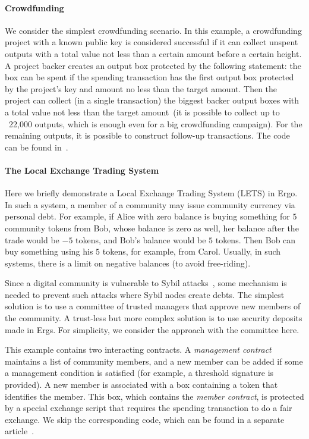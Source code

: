 \paragraph{Crowdfunding}

 We consider the simplest crowdfunding scenario. In this example, a crowdfunding project with a known public key is considered successful if it can collect unspent outputs with a total value not less than a certain amount before a certain height. A project backer creates an output box protected by the following statement: the box can be spent
 if the spending transaction has the first output box protected by the project's key and amount no less than the target amount.
 Then the project can collect (in a single transaction) the biggest backer output boxes with a total value not less than the target amount~(it is possible to collect up to ~22,000 outputs, which is
 enough even for a big crowdfunding campaign). For the remaining outputs, it is possible to construct follow-up transactions. The code can be found in~\cite{ergoTutorial}.

\paragraph{The Local Exchange Trading System}

 Here we briefly demonstrate a Local Exchange Trading System (LETS) in Ergo. In such a system, a member of a community may issue community currency via personal debt. For example, if Alice with zero balance is buying something for $5$
 community tokens from Bob, whose balance is zero as well, her balance after the trade would be $-5$ tokens, and
 Bob's balance would be $5$ tokens. Then Bob can buy something using his $5$ tokens, for example, from Carol.
 Usually, in such systems, there is a limit on negative balances (to avoid free-riding).

 Since a digital community is vulnerable to Sybil attacks~\cite{sybilDef}, some mechanism is needed to prevent such attacks where Sybil nodes create debts.
 The simplest solution is to use a committee of trusted managers that approve new members of the community. A trust-less but more complex solution is to use security deposits made in Ergs. For simplicity, we consider the approach with the committee here.

 This example contains two interacting contracts. A {\em management contract} maintains a list of community members, and a new member can be added if some a management condition is satisfied  (for example, a threshold
 signature is provided). A new member is associated with a box containing a token that identifies the member. This box, which contains the {\em member contract}, is protected by a special exchange script that requires the spending transaction to do a fair exchange.
 We skip the corresponding code, which can be found in a separate article~\cite{letsTutorial}.
 
